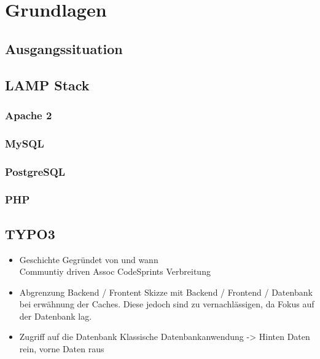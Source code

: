 \chapter{Grundlagen}
\label{ch:basics}

\section{Ausgangssituation}

\section{LAMP Stack}
	\subsection{Apache 2}
	\subsection{MySQL}
	\subsection{PostgreSQL}
	\subsection{PHP}
	
\section{TYPO3}
	\begin{itemize}
		\item Geschichte
		\startchronology[startyear=1995, stopyear=2015]
		\stopchronology
		Gegründet von und wann \\
		Communtiy driven
		Assoc
		CodeSprints
		Verbreitung
		\item Abgrenzung Backend / Frontent
		Skizze mit Backend / Frontend / Datenbank bei erwähnung der Caches. Diese jedoch sind zu vernachlässigen, da
		Fokus auf der Datenbank lag.
		\item Zugriff auf die Datenbank
		Klassische Datenbankanwendung -> Hinten Daten rein, vorne Daten raus
	\end{itemize}
